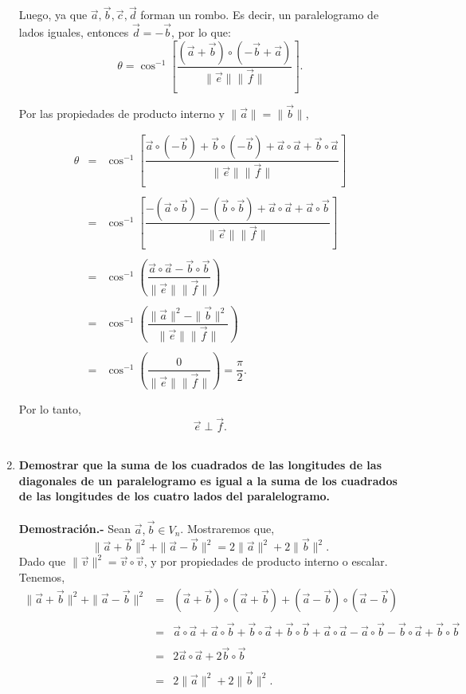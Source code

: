 \begin{enumerate}
	    Luego, ya que $\vec{a},\vec{b},\vec{c},\vec{d}$ forman un rombo. Es decir, un paralelogramo de lados iguales, entonces $\vec{d}=-\vec{b}$, por lo que:
	    $$\theta = \cos^{-1}\left[\dfrac{(\vec{a}+\vec{b})\circ(-\vec{b}+\vec{a})}{\|\vec{e}\|\|\vec{f}\|}\right].$$

	    Por las propiedades de producto interno y $\|\vec{a}\|=\|\vec{b}\|$,

	    $$\begin{array}{rcl}
		\theta&=&\cos^{-1}\left[\dfrac{\vec{a}\circ (-\vec{b})+ \vec{b}\circ(-\vec{b})+ \vec{a}\circ \vec{a}+ \vec{b}\circ \vec{a}}{\|\vec{e}\|\|\vec{f}\|}\right]\\\\
		      &=&\cos^{-1}\left[\dfrac{-(\vec{a}\circ \vec{b})- (\vec{b}\circ \vec{b}) + \vec{a}\circ \vec{a}+ \vec{a}\circ \vec{b}}{\|\vec{e}\|\|\vec{f}\|}\right]\\\\
		      &=&\cos^{-1}\left(\dfrac{ \vec{a}\circ \vec{a}- \vec{b}\circ \vec{b}}{\|\vec{e}\|\|\vec{f}\|}\right)\\\\
		      &=&\cos^{-1}\left(\dfrac{\|\vec{a}\|^2-\|\vec{b}\|^2}{\|\vec{e}\|\|\vec{f}\|}\right)\\\\
		      &=& \cos^{-1}\left(\dfrac{0}{\|\vec{e}\|\|\vec{f}\|}\right) = \dfrac{\pi}{2}.\\\\
	    \end{array}$$
	    Por lo tanto,
	    $$\vec{e}\perp \vec{f}.$$\\

\item \textbf{Demostrar que la suma de los cuadrados de las longitudes de las diagonales de un paralelogramo es igual a la suma de los cuadrados de las longitudes de los cuatro lados del paralelogramo.\\\\
    Demostración.-}\; Sean $\vec{a},\vec{b}\in V_n$. Mostraremos que, 
    $$\|\vec{a}+\vec{b}\|^2+\|\vec{a}-\vec{b}\|^2=2\|\vec{a}\|^2+2\|\vec{b}\|^2.$$
    Dado que $\|\vec{v}\|^2=\vec{v}\circ \vec{v}$, y por propiedades de producto interno o escalar. Tenemos,
    $$\begin{array}{rcl}
	\|\vec{a}+\vec{b}\|^2+\|\vec{a}-\vec{b}\|^2 &=& \left(\vec{a}+\vec{b}\right)\circ \left(\vec{a}+\vec{b}\right)+\left(\vec{a}-\vec{b}\right)\circ \left(\vec{a}-\vec{b}\right)\\\\
						    &=&\vec{a}\circ \vec{a}+\vec{a}\circ \vec{b}+\vec{b}\circ \vec{a}+\vec{b}\circ \vec{b}+\vec{a}\circ\vec{a}-\vec{a}\circ \vec{b}-\vec{b}\circ \vec{a}+\vec{b}\circ \vec{b}\\\\
						    &=& 2\vec{a}\circ \vec{a}+2\vec{b}\circ \vec{b}\\\\
						    &=& 2\|\vec{a}\|^2+2\|\vec{b}\|^2.
    \end{array}$$
    \vspace{0.5cm}


\end{enumerate}

